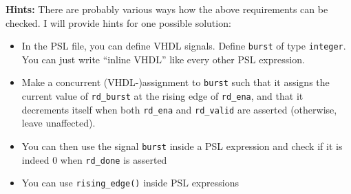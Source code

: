 \documentclass[12pt,epsf,makeidx,oneside]{book}
\begin{document}
{\bf Hints: } There are probably various ways how the above requirements can be checked. I will provide hints for one possible solution:
\begin{itemize}
  \item In the PSL file, you can define VHDL signals. Define {\tt burst} of type {\tt integer}. You can just write ``inline VHDL'' like every other PSL expression.
  \item Make a concurrent (VHDL-)assignment to {\tt burst} such that it assigns the current value of {\tt rd\_burst} at the rising edge of {\tt rd\_ena}, and that it decrements itself when both {\tt rd\_ena} and {\tt rd\_valid} are asserted (otherwise, leave unaffected).
  \item You can then use the signal {\tt burst} inside a PSL expression and check if it is indeed 0 when {\tt rd\_done} is asserted
  \item You can use {\tt rising\_edge()} inside PSL expressions
\end{itemize}
\end{document}
